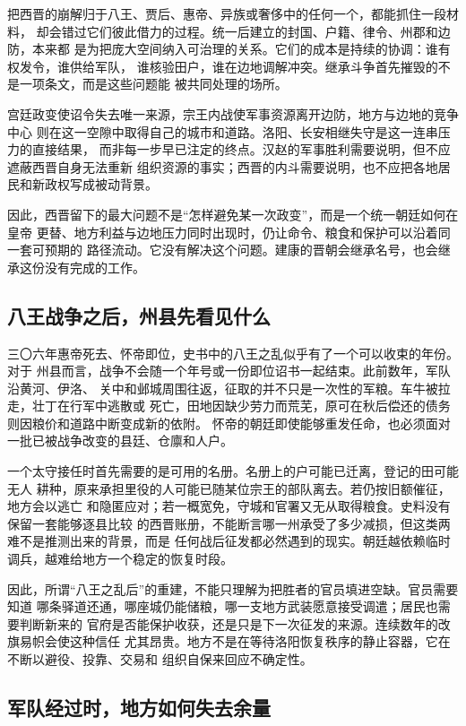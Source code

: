 把西晋的崩解归于八王、贾后、惠帝、异族或奢侈中的任何一个，都能抓住一段材料，
却会错过它们彼此借力的过程。统一后建立的封国、户籍、律令、州郡和边防，本来都
是为把庞大空间纳入可治理的关系。它们的成本是持续的协调：谁有权发令，谁供给军队，
谁核验田户，谁在边地调解冲突。继承斗争首先摧毁的不是一项条文，而是这些问题能
被共同处理的场所。

宫廷政变使诏令失去唯一来源，宗王内战使军事资源离开边防，地方与边地的竞争中心
则在这一空隙中取得自己的城市和道路。洛阳、长安相继失守是这一连串压力的直接结果，
而非每一步早已注定的终点。汉赵的军事胜利需要说明，但不应遮蔽西晋自身无法重新
组织资源的事实；西晋的内斗需要说明，也不应把各地居民和新政权写成被动背景。

因此，西晋留下的最大问题不是“怎样避免某一次政变”，而是一个统一朝廷如何在皇帝
更替、地方利益与边地压力同时出现时，仍让命令、粮食和保护可以沿着同一套可预期的
路径流动。它没有解决这个问题。建康的晋朝会继承名号，也会继承这份没有完成的工作。

\subsection{八王战争之后，州县先看见什么}

三〇六年惠帝死去、怀帝即位，史书中的八王之乱似乎有了一个可以收束的年份。对于
州县而言，战争不会随一个年号或一份即位诏书一起结束。此前数年，军队沿黄河、伊洛、
关中和邺城周围往返，征取的并不只是一次性的军粮。车牛被拉走，壮丁在行军中逃散或
死亡，田地因缺少劳力而荒芜，原可在秋后偿还的债务则因粮价和道路中断变成新的依附。
怀帝的朝廷即使能够重发任命，也必须面对一批已被战争改变的县廷、仓廪和人户。

一个太守接任时首先需要的是可用的名册。名册上的户可能已迁离，登记的田可能无人
耕种，原来承担里役的人可能已随某位宗王的部队离去。若仍按旧额催征，地方会以逃亡
和隐匿应对；若一概宽免，守城和官署又无从取得粮食。史料没有保留一套能够逐县比较
的西晋账册，不能断言哪一州承受了多少减损，但这类两难不是推测出来的背景，而是
任何战后征发都必然遇到的现实。朝廷越依赖临时调兵，越难给地方一个稳定的恢复时段。

因此，所谓“八王之乱后”的重建，不能只理解为把胜者的官员填进空缺。官员需要知道
哪条驿道还通，哪座城仍能储粮，哪一支地方武装愿意接受调遣；居民也需要判断新来的
官府是否能保护收获，还是只是下一次征发的来源。连续数年的改旗易帜会使这种信任
尤其昂贵。地方不是在等待洛阳恢复秩序的静止容器，它在不断以避役、投靠、交易和
组织自保来回应不确定性。

\subsection{军队经过时，地方如何失去余量}

